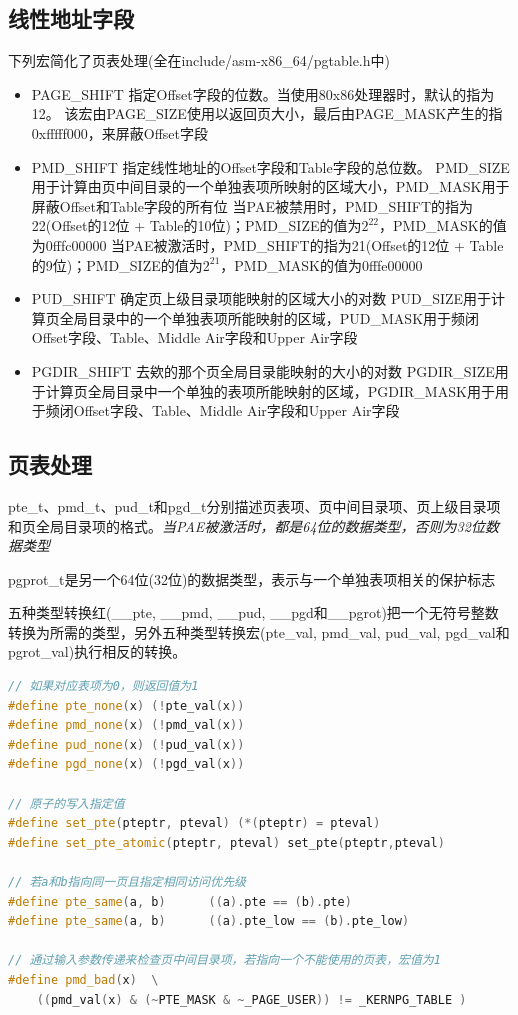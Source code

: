 \subsection{线性地址字段}

    下列宏简化了页表处理(全在include/asm-x86\_64/pgtable.h中)

\begin{itemize}
    \item PAGE\_SHIFT
    \subitem 指定Offset字段的位数。当使用80x86处理器时，默认的指为12。
    \subitem 该宏由PAGE\_SIZE使用以返回页大小，最后由PAGE\_MASK产生的指0xfffff000，来屏蔽Offset字段
    \item PMD\_SHIFT
    \subitem 指定线性地址的Offset字段和Table字段的总位数。
    \subitem PMD\_SIZE用于计算由页中间目录的一个单独表项所映射的区域大小，PMD\_MASK用于屏蔽Offset和Table字段的所有位
    \subitem 当PAE被禁用时，PMD\_SHIFT的指为22(Offset的12位 + Table的10位)；PMD\_SIZE的值为$2^{22}$，PMD\_MASK的值为0fffc00000
    \subitem 当PAE被激活时，PMD\_SHIFT的指为21(Offset的12位 + Table的9位)；PMD\_SIZE的值为$2^{21}$，PMD\_MASK的值为0fffe00000
    \item PUD\_SHIFT
    \subitem 确定页上级目录项能映射的区域大小的对数
    \subitem PUD\_SIZE用于计算页全局目录中的一个单独表项所能映射的区域，PUD\_MASK用于频闭Offset字段、Table、Middle Air字段和Upper Air字段
    \item PGDIR\_SHIFT
    \subitem 去欸的那个页全局目录能映射的大小的对数
    \subitem PGDIR\_SIZE用于计算页全局目录中一个单独的表项所能映射的区域，PGDIR\_MASK用于用于频闭Offset字段、Table、Middle Air字段和Upper Air字段
\end{itemize}

\subsection{页表处理}

    pte\_t、pmd\_t、pud\_t和pgd\_t分别描述页表项、页中间目录项、页上级目录项和页全局目录项的格式。\emph{当PAE被激活时，都是64位的数据类型，否则为32位数据类型}

    pgprot\_t是另一个64位(32位)的数据类型，表示与一个单独表项相关的保护标志

    五种类型转换红(\_\_pte, \_\_pmd, \_\_pud, \_\_pgd和\_\_pgrot)把一个无符号整数转换为所需的类型，另外五种类型转换宏(pte\_val, pmd\_val, pud\_val, pgd\_val和pgrot\_val)执行相反的转换。

\begin{lstlisting}[language=C++]
// 如果对应表项为0，则返回值为1
#define pte_none(x)	(!pte_val(x))
#define pmd_none(x)	(!pmd_val(x))
#define pud_none(x)	(!pud_val(x))
#define pgd_none(x)	(!pgd_val(x))

// 原子的写入指定值
#define set_pte(pteptr, pteval) (*(pteptr) = pteval)
#define set_pte_atomic(pteptr, pteval) set_pte(pteptr,pteval)

// 若a和b指向同一页且指定相同访问优先级
#define pte_same(a, b)		((a).pte == (b).pte)
#define pte_same(a, b)		((a).pte_low == (b).pte_low)

// 通过输入参数传递来检查页中间目录项，若指向一个不能使用的页表，宏值为1
#define	pmd_bad(x)	\
    ((pmd_val(x) & (~PTE_MASK & ~_PAGE_USER)) != _KERNPG_TABLE )
\end{lstlisting}

